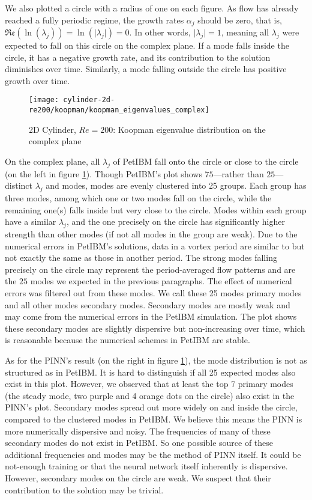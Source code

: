 We also plotted a circle with a radius of one on each figure.
As flow has already reached a fully periodic regime, the growth rates $\alpha_j$ should be zero, that is, $\mathfrak{Re}\left(\ln\left(\lambda_j\right)\right) = \ln\left(\lvert \lambda_j \rvert\right) = 0$.
In other words, $\lvert \lambda_j \rvert = 1$, meaning all $\lambda_j$ were expected to fall on this circle on the complex plane.
If a mode falls inside the circle, it has a negative growth rate, and its contribution to the solution diminishes over time.
Similarly, a mode falling outside the circle has positive growth over time.

\begin{figure}[hbt!]
    \centering
    \texttt{[image: cylinder-2d-re200/koopman/koopman\_eigenvalues\_complex]}
    \caption{2D Cylinder, $Re=200$: Koopman eigenvalue distribution on the complex plane}
    \label{fig:koopman-eigval-dist}
\end{figure}

On the complex plane, all $\lambda_j$ of PetIBM fall onto the circle or close to the circle (on the left in figure \ref{fig:koopman-eigval-dist}).
Though PetIBM's plot shows $75$---rather than $25$---distinct $\lambda_j$ and modes, modes are evenly clustered into 25 groups.
Each group has three modes, among which one or two modes fall on the circle, while the remaining one(s) falls inside but very close to the circle.
Modes within each group have a similar $\lambda_j$, and the one precisely on the circle has significantly higher strength than other modes (if not all modes in the group are weak).
Due to the numerical errors in PetIBM's solutions, data in a vortex period are similar to but not exactly the same as those in another period.
The strong modes falling precisely on the circle may represent the period-averaged flow patterns and are the $25$ modes we expected in the previous paragraphs. 
The effect of numerical errors was filtered out from these modes.
We call these 25 modes primary modes and all other modes secondary modes.
Secondary modes are mostly weak and may come from the numerical errors in the PetIBM simulation.
The plot shows these secondary modes are slightly dispersive but non\hyp{}increasing over time, which is reasonable because the numerical schemes in PetIBM are stable.

As for the PINN's result (on the right in figure \ref{fig:koopman-eigval-dist}), the mode distribution is not as structured as in PetIBM.
It is hard to distinguish if all 25 expected modes also exist in this plot.
However, we observed that at least the top 7 primary modes (the steady mode, two purple and 4 orange dots on the circle) also exist in the PINN's plot.
Secondary modes spread out more widely on and inside the circle, compared to the clustered modes in PetIBM.
We believe this means the PINN is more numerically dispersive and noisy.
The frequencies of many of these secondary modes do not exist in PetIBM.
So one possible source of these additional frequencies and modes may be the method of PINN itself.
It could be not-enough training or that the neural network itself inherently is dispersive. 
However, secondary modes on the circle are weak.
We suspect that their contribution to the solution may be trivial.

